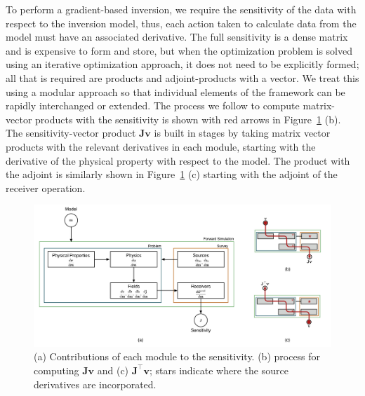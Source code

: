 \documentclass[preprint,review,3p,times,onecolumn,authoryear]{elsarticle}
\begin{document}
To perform a gradient-based inversion, we require the sensitivity of the data
with respect to the inversion model, thus, each action taken to calculate data
from the model must have an associated derivative. The full sensitivity is a
dense matrix and is expensive to form and store, but when the optimization
problem is solved using an iterative optimization approach, it does not need
to be explicitly formed; all that is required are products and adjoint-products
with a vector. We treat this using a modular approach so that individual
elements of the framework can be rapidly interchanged or extended. The process
we follow to compute matrix-vector products with the sensitivity is shown with red arrows in
Figure~\ref{fig:Jvec} (b). The sensitivity-vector product $\mathbf{Jv}$ is built in stages by taking matrix
vector products with the relevant derivatives in each module, starting with the derivative of the physical property with respect to the model.
The product with the adjoint is similarly shown in Figure~\ref{fig:Jvec} (c) starting with the adjoint of the receiver operation.


{%
\begin{figure}[htb!]
    \centering
    \includegraphics[width=\textwidth]{images/simpegEM_sensitivity_J_JTvec_5.png}
    \caption{(a) Contributions of each module to the sensitivity. (b) process for computing $\mathbf{J} \mathbf{v}$ and (c) $\mathbf{J}^{\top}\mathbf{v}$; stars indicate where the source derivatives are incorporated.}
\label{fig:Jvec}
\end{figure}
}
\end{document}
